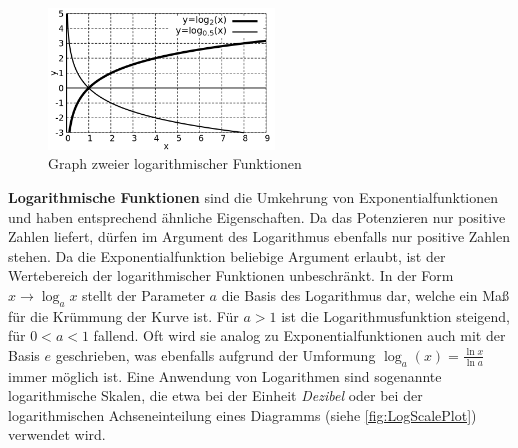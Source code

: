 \begin{minipage}[t]{1\textwidth}
    \begin{figure}
        \centering
        \includegraphics[width=6cm]{./gnuplot/base-function-log}
        \caption{Graph zweier logarithmischer Funktionen}
        \label{fig:ExBaseFunLog}
    \end{figure}
    \textbf{Logarithmische Funktionen} sind die Umkehrung von Exponentialfunktionen und haben entsprechend ähnliche Eigenschaften. Da das Potenzieren nur positive Zahlen liefert, dürfen im Argument des Logarithmus ebenfalls nur positive Zahlen stehen. Da die Exponentialfunktion beliebige Argument erlaubt, ist der Wertebereich der logarithmischer Funktionen unbeschränkt. In der Form $x \to \log_a{x}$ stellt der Parameter $a$ die Basis des Logarithmus dar, welche ein Maß für die Krümmung der Kurve ist. Für $a>1$ ist die Logarithmusfunktion steigend, für $0<a<1$ fallend. Oft wird sie analog zu Exponentialfunktionen auch mit der Basis $e$ geschrieben, was ebenfalls aufgrund der Umformung $\log_a(x) = \frac{\ln x}{\ln a}$ immer möglich ist. Eine Anwendung von Logarithmen sind sogenannte logarithmische Skalen, die etwa bei der Einheit \emph{Dezibel} oder bei der logarithmischen Achseneinteilung eines Diagramms (siehe \ref{fig:LogScalePlot}) verwendet wird.
\end{minipage}

